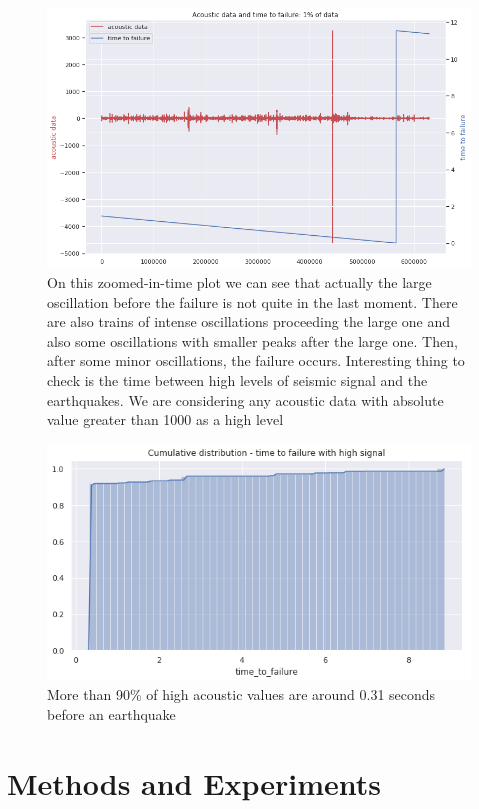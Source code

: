 \documentclass[]{llncs} %
\begin{document}
\begin{figure}
	\centering
	\includegraphics[width=0.7\linewidth]{../GPUProject/zoomedInTimePlot}
	\caption{On this zoomed-in-time plot we can see that actually the large oscillation before the failure is not quite in the last moment. There are also trains of intense oscillations proceeding the large one and also some oscillations with smaller peaks after the large one. Then, after some minor oscillations, the failure occurs. Interesting thing to check is the time between high levels of seismic signal and the earthquakes. We are considering any acoustic data with absolute value greater than 1000 as a high level}
	\label{fig:zoomedintimeplot}
\end{figure}

\begin{figure}
	\centering
	\includegraphics[width=0.7\linewidth]{../GPUProject/moreThan90percent}
	\caption{More than 90\% of high acoustic values are around 0.31 seconds before an earthquake}
		\label{fig:morethan90percenta}
	\end{figure}

\section{Methods and Experiments}
\end{document}
